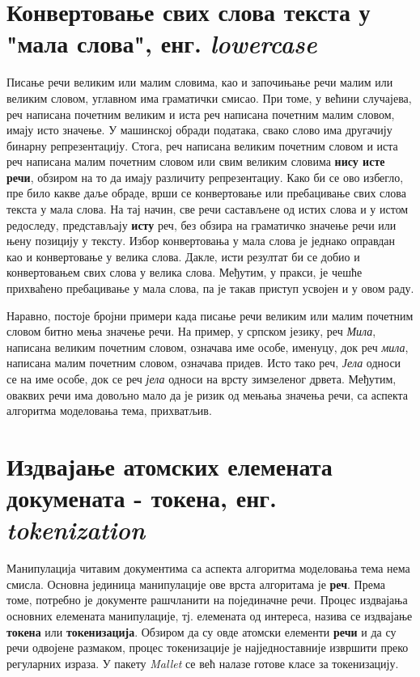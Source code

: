 \section{Конвертовање свих слова текста у "мала слова", енг. \textit{lowercase}}

Писање речи великим или малим словима, као и започињање речи малим или великим словом, углавном има граматички смисао. При томе, у већини случајева, реч написана почетним великим и иста реч написана почетним  малим словом, имају исто значење. У машинској обради података, свако слово има другачију бинарну репрезентацију. Стога, реч написана великим почетним словом и иста реч написана малим почетним словом или свим великим словима \textbf{нису исте речи}, обзиром на то да имају различиту репрезентациу. Како би се ово избегло, пре било какве даље обраде, врши се конвертовање или пребацивање свих слова текста у мала слова. На тај начин, све речи састављене од истих слова и у истом редоследу, представљају \textbf{исту} реч, без обзира на граматичко значење речи или њену позицију у тексту. Избор конвертовања у мала слова је једнако оправдан као и  конвертовање у велика слова. Дакле, исти резултат би се добио и конвертовањем свих слова у велика слова. Међутим, у пракси, је чешће прихваћено пребацивање у мала слова, па је такав приступ усвојен и у овом раду.

Наравно, постоје бројни примери када писање речи великим или малим почетним словом битно мења значење речи. На пример, у српском језику, реч \textit{Мила}, написана великим почетним словом, означава име особе, именуцу, док реч \textit{мила}, написана малим почетним словом, означава придев. Исто тако реч, \textit{Јела} односи се на име особе, док се реч \textit{јела} односи на врсту зимзеленог дрвета. 
Међутим, оваквих речи има довољно мало да је ризик од мењања значења речи, са аспекта алгоритма моделовања тема, прихватљив.


\section{Издвајање атомских елемената докумената - токена, енг. \textit{tokenization}}

Манипулација читавим документима са аспекта алгоритма моделовања тема нема смисла. Основна јединица манипулације ове врста алгоритама је \textbf{реч}. Према томе, потребно је документе рашчланити на појединачне речи. Процес издвајања основних елемената манипулације, тј. елемената од интереса, назива се издвајање \textbf{токена} или \textbf{токенизација}. Обзиром да су овде атомски елементи \textbf{речи} и да су речи одвојене размаком, процес токенизације је најједноставније извршити преко регуларних израза. У пакету \textit{Mallet} се већ налазе готове класе за токенизацију.

